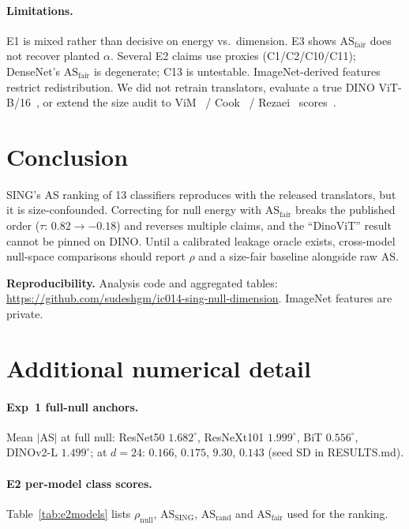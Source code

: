 \documentclass[10pt,twocolumn]{article}
\begin{document}
\paragraph{Limitations.}
E1 is mixed rather than decisive on energy vs.\ dimension.
E3 shows $\mathrm{AS}_{\mathrm{fair}}$ does not recover planted $\alpha$.
Several E2 claims use proxies (C1/C2/C10/C11); DenseNet's $\mathrm{AS}_{\mathrm{fair}}$ is degenerate; C13 is untestable.
ImageNet-derived features restrict redistribution.
We did not retrain translators, evaluate a true DINO ViT-B/16~\citep{dino2021}, or extend the size audit to ViM~\citep{vim2022} / Cook~\citep{cook2020} / Rezaei~\citep{rezaei2023} scores~\citep{makonnen2025}.

\section{Conclusion}
\vspace{-0.2em}
SING's AS ranking of 13 classifiers reproduces with the released translators, but it is size-confounded. Correcting for null energy with $\mathrm{AS}_{\mathrm{fair}}$ breaks the published order ($\tau{:}\,0.82\to{-}0.18$) and reverses multiple claims, and the ``DinoViT'' result cannot be pinned on DINO.
Until a calibrated leakage oracle exists, cross-model null-space comparisons should report $\rho$ and a size-fair baseline alongside raw AS.

\vspace{0.4em}
\noindent\textbf{Reproducibility.}
Analysis code and aggregated tables: \url{https://github.com/sudeshgm/ic014-sing-null-dimension}.
ImageNet features are private.

{\small


}

\appendix
\section{Additional numerical detail}
\vspace{-0.2em}
\paragraph{Exp~1 full-null anchors.}
Mean $|$AS$|$ at full null: ResNet50 $1.682^\circ$, ResNeXt101 $1.999^\circ$, BiT $0.556^\circ$, DINOv2-L $1.499^\circ$; at $d{=}24$: $0.166$, $0.175$, $9.30$, $0.143$ (seed SD in RESULTS.md).

\paragraph{E2 per-model class scores.}
Table~\ref{tab:e2models} lists $\rho_{\mathrm{null}}$, $\mathrm{AS}_{\mathrm{SING}}$, $\mathrm{AS}_{\mathrm{rand}}$ and $\mathrm{AS}_{\mathrm{fair}}$ used for the ranking.
\end{document}
